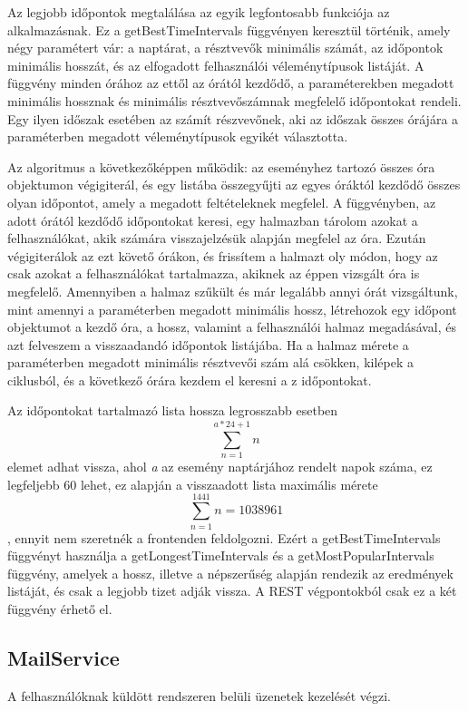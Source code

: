 \documentclass[a4paper,12pt]{report}
\theoremstyle{definition}
\theoremstyle{remark}
\begin{document}
Az legjobb időpontok megtalálása az egyik legfontosabb funkciója az alkalmazásnak. Ez a getBestTimeIntervals függvényen keresztül történik, amely négy paramétert vár: a naptárat, a résztvevők minimális számát, az időpontok minimális hosszát, és az elfogadott felhasználói véleménytípusok listáját. A függvény minden órához az ettől az órától kezdődő, a paraméterekben megadott minimális hossznak és minimális résztvevőszámnak megfelelő időpontokat rendeli. Egy ilyen időszak esetében az számít részvevőnek, aki az időszak összes órájára a paraméterben megadott véleménytípusok egyikét választotta.

Az algoritmus a következőképpen működik: az eseményhez tartozó összes óra objektumon végigiterál, és egy listába összegyűjti az egyes óráktól kezdődő összes olyan időpontot, amely a megadott feltételeknek megfelel. A függvényben, az adott órától kezdődő időpontokat keresi, egy halmazban tárolom azokat a felhasználókat, akik számára visszajelzésük alapján megfelel az óra. Ezután végigiterálok az ezt követő órákon, és frissítem a halmazt oly módon, hogy az csak azokat a felhasználókat tartalmazza, akiknek az éppen vizsgált óra is megfelelő. Amennyiben a halmaz szűkült és már legalább annyi órát vizsgáltunk, mint amennyi a paraméterben megadott minimális hossz, létrehozok egy időpont objektumot a kezdő óra, a hossz, valamint a felhasználói halmaz megadásával, és azt felveszem a visszaadandó időpontok listájába. Ha a halmaz mérete a paraméterben megadott minimális résztvevői szám alá csökken, kilépek a ciklusból, és a következő órára kezdem el keresni a z időpontokat.

Az időpontokat tartalmazó lista hossza legrosszabb esetben \[ \sum_{n=1}^{a*24+1} {n} \] elemet adhat vissza, ahol \textit{a} az esemény naptárjához rendelt napok száma, ez legfeljebb 60 lehet, ez alapján a visszaadott lista maximális mérete \[ \sum_{n=1}^{1441} {n} = 1 038 961 \], ennyit nem szeretnék a frontenden feldolgozni. Ezért a getBestTimeIntervals függvényt használja a getLongestTimeIntervals és a getMostPopularIntervals függvény, amelyek a hossz, illetve a népszerűség alapján rendezik az eredmények listáját, és csak a legjobb tizet adják vissza. A REST végpontokból csak ez a két függvény érhető el.

\subsection{MailService}

A felhasználóknak küldött rendszeren belüli üzenetek kezelését végzi.
\end{document}
